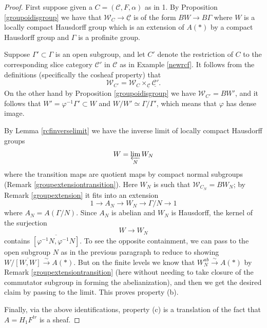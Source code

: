 \documentclass[12pt]{article}
\theoremstyle{definition}
\newcommand{\mc}{\mathcal}
\newcommand{\ul}{\underline}
\begin{document}
\begin{proof}
First suppose given a $C=(\mc{C},F,\alpha)$ as in 1.  By Proposition \ref{groupoidisgroup} we have that $\mc{W}_C\to\ul{\mc{C}}$ is of the form $BW\to B\Gamma$ where $W$ is a locally compact Hausdorff group which is an extension of $A(\ast)$ by a compact Hausdorff group and $\Gamma$ is a profinite group.

Suppose $\Gamma'\subset \Gamma$ is an open subgroup, and let $C'$ denote the restriction of $C$ to the corresponding slice category $\mc{C}'$ in $\mc{C}$ as in Example \ref{newrcf}.  It follows from the definitions (specifically the cosheaf property) that $$\mc{W}_{C'} = \mc{W}_C\times_{\ul{\mc{C}}}\ul{\mc{C}'}.$$
On the other hand by Proposition \ref{groupoidisgroup} we have $\mc{W}_{C'} = BW'$, and it follows that $W'= \varphi^{-1}\Gamma'\subset W$ and $W/W'\simeq \Gamma/\Gamma'$, which means that $\varphi$ has dense image.

By Lemma \ref{rcfinverselimit} we have the inverse limit of locally compact Hausdorff groups
$$W = \varprojlim_N W_N$$
where the transition maps are quotient maps by compact normal subgroups (Remark \ref{groupextensiontransition}).  Here $W_N$ is such that $\mc{W}_{C_N} = BW_N$; by Remark \ref{groupextension} it fits into an extension
$$1\to A_N \to W_N \to \Gamma/N \to 1$$
where $A_N = A(\Gamma/N)$.  Since $A_N$ is abelian and $W_N$ is Hausdorff, the kernel of the surjection $$W\to W_N$$ contains $\overline{[\varphi^{-1}N,\varphi^{-1}N]}$.  To see the opposite containment, we can pass to the open subgroup $N$ as in the previous paragraph to reduce to showing $W/\overline{[W,W]}\overset{\sim}{\rightarrow} A(\ast)$. But on the finite levels we know that $W_N^{ab}\overset{\sim}{\rightarrow} A(\ast)$ by Remark \ref{groupextensiontransition} (here without needing to take closure of the commutator subgroup in forming the abelianization), and then we get the desired claim by passing to the limit.  This proves property (b).

Finally, via the above identifications, property (c) is a translation of the fact that $A=H_1F^{tr}$ is a sheaf.


\end{proof}
\end{document}
